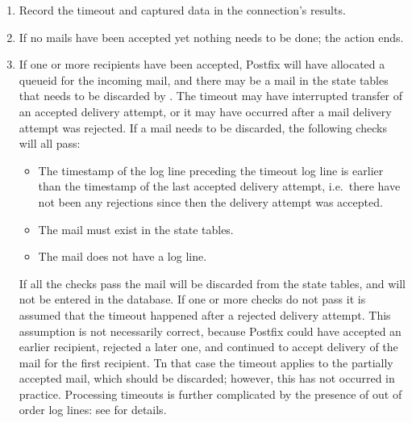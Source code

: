 \begin{enumerate}

    \item Record the timeout and captured data in the connection's results.

    \item If no mails have been accepted yet nothing needs to be done; the
         action ends.

    \item If one or more recipients have been accepted, Postfix will have
        allocated a queueid for the incoming mail, and there may be a mail
        in the state tables that needs to be discarded by \parsername{}.  The timeout may
        have interrupted transfer of an accepted delivery attempt, or it
        may have occurred after a mail delivery attempt was rejected.  If a
        mail needs to be discarded, the following checks will all pass:

        \begin{itemize}

            \item The timestamp of the log line preceding the timeout log
                line is earlier than the timestamp of the last accepted
                delivery attempt, i.e.\ there have not been any rejections
                since then the delivery attempt was accepted.

            \item The mail must exist in the state tables.

            \item The mail does not have a  log line.

        \end{itemize}

        If all the checks pass the mail will be discarded from the state
        tables, and will not be entered in the database.  If one or more
        checks do not pass it is assumed that the timeout happened after a
        rejected delivery attempt.  This assumption is not necessarily
        correct, because Postfix could have accepted an earlier recipient,
        rejected a later one, and continued to accept delivery of the mail
        for the first recipient.  Tn that case the timeout applies to the
        partially accepted mail, which should be discarded; however, this
        has not occurred in practice.  Processing timeouts is further
        complicated by the presence of out of order  log
        lines: see  for details.

\end{enumerate}

